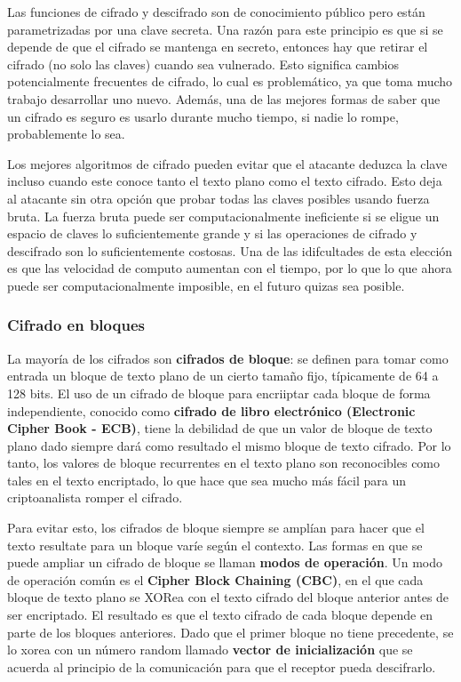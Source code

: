 Las funciones de cifrado y descifrado son de conocimiento público pero están parametrizadas por una clave secreta. Una razón para este principio es que si se depende de que el cifrado se mantenga en secreto, entonces hay que retirar el cifrado (no solo las claves) cuando sea vulnerado. Esto significa cambios potencialmente frecuentes de cifrado, lo cual es problemático, ya que toma mucho trabajo desarrollar uno nuevo. Además, una de las mejores formas de saber que un cifrado es seguro es usarlo durante mucho tiempo, si nadie lo rompe, probablemente lo sea.

Los mejores algoritmos de cifrado pueden evitar que el atacante deduzca la clave incluso cuando este conoce tanto el texto plano como el texto cifrado. Esto deja al atacante sin otra opción que probar todas las claves posibles usando fuerza bruta. La fuerza bruta puede ser computacionalmente ineficiente si se eligue un espacio de claves lo suficientemente grande y si las operaciones de cifrado y descifrado son lo suficientemente costosas. Una de las idifcultades de esta elección es que las velocidad de computo aumentan con el tiempo, por lo que lo que ahora puede ser computacionalmente imposible, en el futuro quizas sea posible.

\subsubsection{Cifrado en bloques}
La mayoría de los cifrados son \textbf{cifrados de bloque}: se definen para tomar como entrada un bloque de texto plano de un cierto tamaño fijo, típicamente de 64 a 128 bits. El uso de un cifrado de bloque para encriiptar cada bloque de forma independiente, conocido como \textbf{cifrado de libro electrónico (Electronic Cipher Book - ECB)}, tiene la debilidad de que un valor de bloque de texto plano dado siempre dará como resultado el mismo bloque de texto cifrado. Por lo tanto, los valores de bloque recurrentes en el texto plano son reconocibles como tales en el texto encriptado, lo que hace que sea mucho más fácil para un criptoanalista romper el cifrado.

Para evitar esto, los cifrados de bloque siempre se amplían para hacer que el texto resultate para un bloque varíe según el contexto. Las formas en que se puede ampliar un cifrado de bloque se llaman \textbf{modos de operación}. Un modo de operación común es el \textbf{Cipher Block Chaining (CBC)}, en el que cada bloque de texto plano se XORea con el texto cifrado del bloque anterior antes de ser encriptado. El resultado es que el texto cifrado de cada bloque depende en parte de los bloques anteriores. Dado que el primer bloque no tiene precedente, se lo xorea con un número random llamado \textbf{vector de inicialización} que se acuerda al principio de la comunicación para que el receptor pueda descifrarlo.

